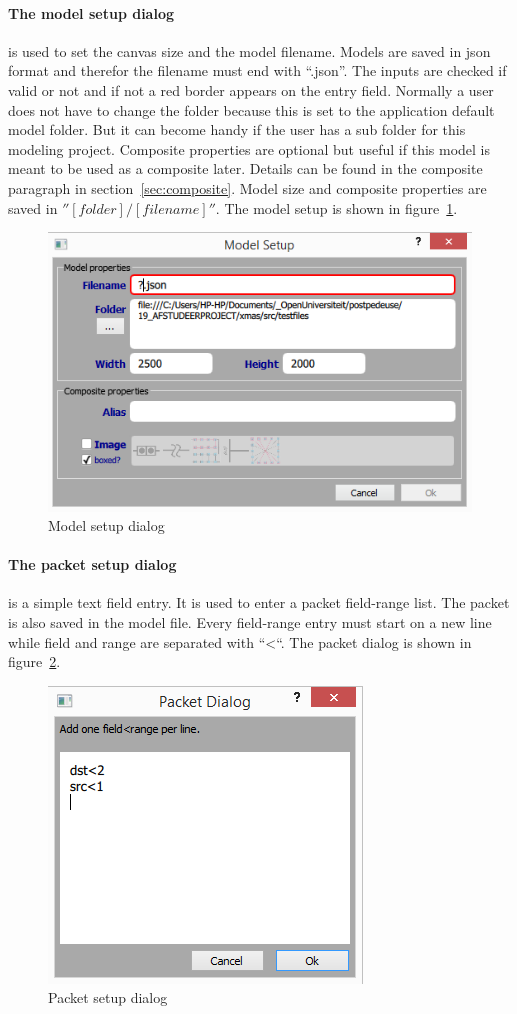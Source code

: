 \paragraph{The model setup dialog}is used to set the canvas size and the model
filename. Models are saved in json format and therefor the filename must end
with ``.json''. The inputs are checked if valid or not and if not a red border
appears on the entry field. Normally a user does not have to change the folder
because this is set to the application default model folder. But it can become
handy if the user has a sub folder for this modeling project. Composite
properties are optional but useful if this model is meant to be used as a
composite later. Details can be found in the composite paragraph in
section~\ref{sec:composite}. Model size and composite properties are saved in
$''[folder]/[filename]''$. The model setup is shown in
figure~\ref{fig:model-setup}.


\begin{figure}[here]
\begin{center}	
	\includegraphics[width=.70\linewidth]{pictures/model-setup}
	\caption{Model setup dialog}
	\label{fig:model-setup}
\end{center}
\end{figure}

\paragraph{The packet setup dialog} is a simple text field entry. It is used to
enter a packet field-range list. The packet is also saved in the model file.
Every field-range entry must start on a new line while field and range are separated with ``\textless ``.
The packet dialog is shown in figure~\ref{fig:packet-setup}.
   
\begin{figure}[here]
\begin{center}	
	\includegraphics[width=.30\linewidth]{pictures/packet-setup}
	\caption{Packet setup dialog}
	\label{fig:packet-setup}
\end{center}
\end{figure}


